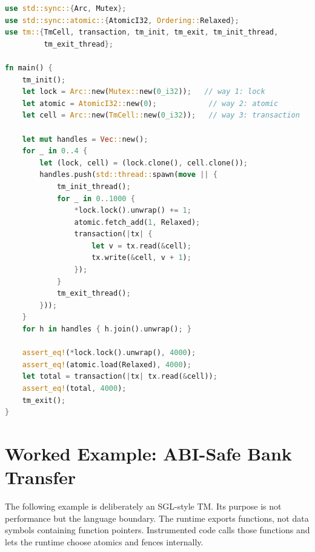 \begin{lstlisting}[language=Rust, caption={The shared counter three ways
in Rust: lock, atomic, and transaction (companion \texttt{tm} crate).},
label={lst:counter-rust}]
use std::sync::{Arc, Mutex};
use std::sync::atomic::{AtomicI32, Ordering::Relaxed};
use tm::{TmCell, transaction, tm_init, tm_exit, tm_init_thread,
         tm_exit_thread};

fn main() {
    tm_init();
    let lock = Arc::new(Mutex::new(0_i32));   // way 1: lock
    let atomic = AtomicI32::new(0);            // way 2: atomic
    let cell = Arc::new(TmCell::new(0_i32));   // way 3: transaction

    let mut handles = Vec::new();
    for _ in 0..4 {
        let (lock, cell) = (lock.clone(), cell.clone());
        handles.push(std::thread::spawn(move || {
            tm_init_thread();
            for _ in 0..1000 {
                *lock.lock().unwrap() += 1;
                atomic.fetch_add(1, Relaxed);
                transaction(|tx| {
                    let v = tx.read(&cell);
                    tx.write(&cell, v + 1);
                });
            }
            tm_exit_thread();
        }));
    }
    for h in handles { h.join().unwrap(); }

    assert_eq!(*lock.lock().unwrap(), 4000);
    assert_eq!(atomic.load(Relaxed), 4000);
    let total = transaction(|tx| tx.read(&cell));
    assert_eq!(total, 4000);
    tm_exit();
}
\end{lstlisting}

\section{Worked Example: ABI-Safe Bank Transfer}
\label{sec:abi-safe-bank-transfer}

The following example is deliberately an SGL-style TM. Its purpose is not
performance but the language boundary. The runtime exports functions, not
data symbols containing function pointers. Instrumented code calls those
functions and lets the runtime choose atomics and fences internally.

